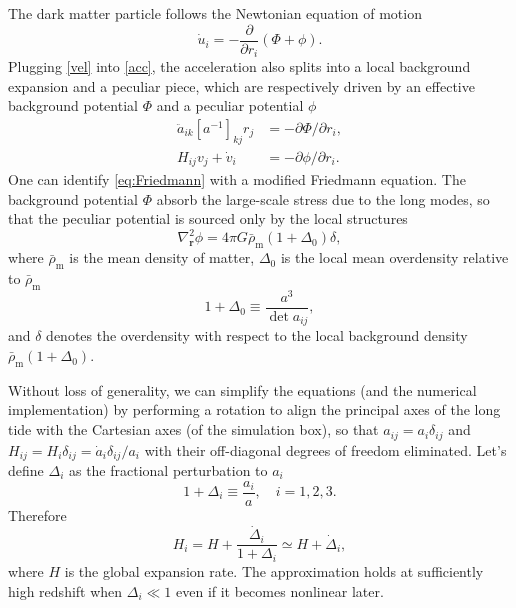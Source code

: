 \documentclass[a4paper,11pt]{article}
\newcommand{\vr}{{\bm r}}
\newcommand{\rhobarm}{{\bar\rho_\mathrm{m}}}
\begin{document}
The dark matter particle follows the Newtonian equation of motion
\begin{equation}
    \dot u_i = - \frac{\partial}{\partial r_i} (\Phi + \phi).
    \label{eq:acc}
\end{equation}
Plugging \eqref{vel} into \eqref{acc}, the acceleration also splits into
a local background expansion and a peculiar piece,
which are respectively driven by an effective background potential $\Phi$ and
a peculiar potential $\phi$
\begin{align}
    \ddot a_{ik} [a^{-1}]_{kj} r_j &= - \partial\Phi / \partial r_i,
    \label{eq:Friedmann} \\
    H_{ij} v_j + \dot v_i &= - \partial\phi / \partial r_i.
    \label{eq:pecvel}
\end{align}
One can identify \eqref{eq:Friedmann} with a modified Friedmann equation.
The background potential $\Phi$ absorb the large-scale stress due to the long
modes, so that the peculiar potential is sourced only by the local structures
\begin{equation}
    \nabla_\vr^2 \phi = 4\pi G \rhobarm (1 + \Delta_0) \delta,
    \label{eq:poisson_local}
\end{equation}
where $\rhobarm$ is the mean density of matter, $\Delta_0$ is the
local mean overdensity relative to $\rhobarm$
\begin{equation}
    1 + \Delta_0 \equiv \frac{a^3}{\det a_{ij}},
    \label{eq:D0=det}
\end{equation}
and $\delta$ denotes the overdensity with respect to the local background
density $\rhobarm (1 + \Delta_0)$.

Without loss of generality, we can simplify the equations (and the numerical
implementation) by performing a rotation to align the principal axes of the
long tide with the Cartesian axes (of the simulation box), so that $a_{ij} =
a_i \delta_{ij}$ and $H_{ij} = H_i \delta_{ij} = \dot a_i \delta_{ij} / a_i$
with their off-diagonal degrees of freedom eliminated.
Let's define $\Delta_i$ as the fractional perturbation to $a_i$
\begin{equation}
    1 + \Delta_i \equiv \frac{a_i} a, \quad i = 1, 2, 3.
\end{equation}
Therefore
\begin{equation}
    H_i = H + \frac{\dot{\Delta}_i}{1+\Delta_i}
    \simeq H +\dot{\Delta}_i,
    \label{eq:Hi}
\end{equation}
where $H$ is the global expansion rate.
The approximation holds at sufficiently high redshift when $\Delta_i \ll 1$
even if it becomes nonlinear later.
\end{document}
